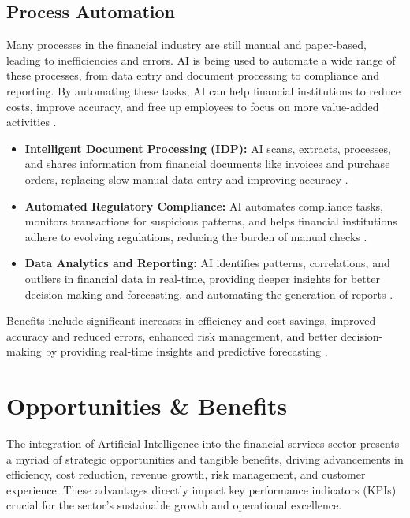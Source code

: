 \subsection{Process Automation}
Many processes in the financial industry are still manual and paper-based, leading to inefficiencies and errors. AI is being used to automate a wide range of these processes, from data entry and document processing to compliance and reporting. By automating these tasks, AI can help financial institutions to reduce costs, improve accuracy, and free up employees to focus on more value-added activities \cite{lopez2019artificial}.
\begin{itemize}
    \item \textbf{Intelligent Document Processing (IDP):} AI scans, extracts, processes, and shares information from financial documents like invoices and purchase orders, replacing slow manual data entry and improving accuracy \cite{Stampli_ProcessAutomation}.
    \item \textbf{Automated Regulatory Compliance:} AI automates compliance tasks, monitors transactions for suspicious patterns, and helps financial institutions adhere to evolving regulations, reducing the burden of manual checks \cite{Deloitte_ProcessAutomation, UMass_ProcessAutomation}.
    \item \textbf{Data Analytics and Reporting:} AI identifies patterns, correlations, and outliers in financial data in real-time, providing deeper insights for better decision-making and forecasting, and automating the generation of reports \cite{RelevanceLab_ProcessAutomation}.
\end{itemize}
Benefits include significant increases in efficiency and cost savings, improved accuracy and reduced errors, enhanced risk management, and better decision-making by providing real-time insights and predictive forecasting \cite{EY_ProcessAutomation, IBM_ProcessAutomation}.

\section{Opportunities \& Benefits}

The integration of Artificial Intelligence into the financial services sector presents a myriad of strategic opportunities and tangible benefits, driving advancements in efficiency, cost reduction, revenue growth, risk management, and customer experience. These advantages directly impact key performance indicators (KPIs) crucial for the sector's sustainable growth and operational excellence.


